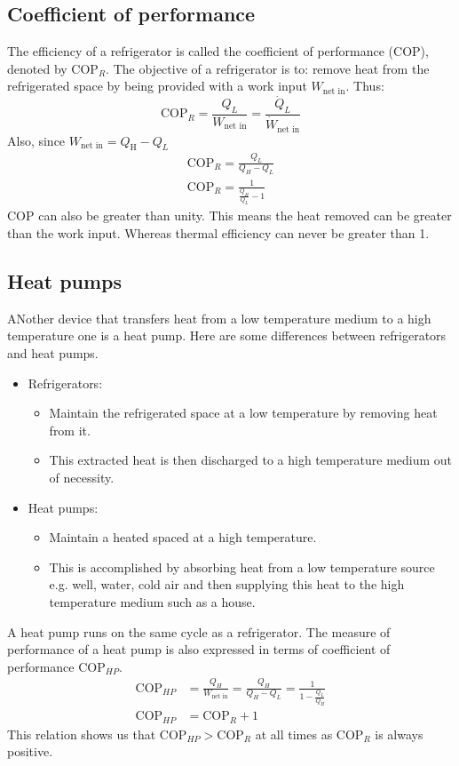 \documentclass[class=report, crop=false, 12pt,a4paper]{standalone}
\begin{document}
\subsection{Coefficient of performance}
The efficiency of a refrigerator is called the coefficient of performance (COP), denoted by \(\textrm{COP}_R\). The objective of a refrigerator is to: remove heat from the refrigerated space by being provided with a work input \(W_{\textrm{net in}}\). Thus:
\begin{equation}
  \textrm{COP}_R = \frac{Q_L}{W_{\textrm{net in}}} = \frac{\dot{Q}_L}{\dot{W}_{\textrm{net in}}} 
\end{equation}
Also, since \(W_{\textrm{net in}} = Q_{\textrm{H}} - Q_L\)
\begin{align}
  \textrm{COP}_R = \frac{Q_L}{Q_H-Q_L} \\
  \textrm{COP}_R = \frac{1}{\frac{Q_H}{Q_L} - 1}
\end{align}
COP can also be greater than unity. This means the heat removed can be greater than the work input. Whereas thermal efficiency can never be greater than 1. 
\subsection{Heat pumps}
ANother device that transfers heat from a low temperature medium to a high temperature one is a heat pump. 
Here are some differences between refrigerators and heat pumps.
\begin{itemize}[noitemsep]
  \item Refrigerators:
  \begin{itemize}
    \item Maintain the refrigerated space at a low temperature by removing heat from it.
    \item This extracted heat is then discharged to a high temperature medium out of necessity.
  \end{itemize}
  \item Heat pumps:
  \begin{itemize}
    \item Maintain a heated spaced at a high temperature.
    \item This is accomplished by absorbing heat from a low temperature source e.g. well, water, cold air and then supplying this heat to the high temperature medium such as a house.
  \end{itemize}
\end{itemize}
A heat pump runs on the same cycle as a refrigerator. The measure of performance of a heat pump is also expressed in terms of coefficient of performance \(\textrm{COP}_{HP}\).
\begin{align}
  \textrm{COP}_{HP} &= \frac{Q_H}{W_{\textrm{net in}}} = \frac{Q_H}{Q_H - Q_L} = \frac{1}{1 - \frac{Q_L}{Q_H}} \\
  \textrm{COP}_{HP} &= \textrm{COP}_R + 1 
\end{align}
This relation shows us that $\textrm{COP}_{HP} > \textrm{COP}_R$ at all times as $\textrm{COP}_R$ is always positive.
\end{document}
